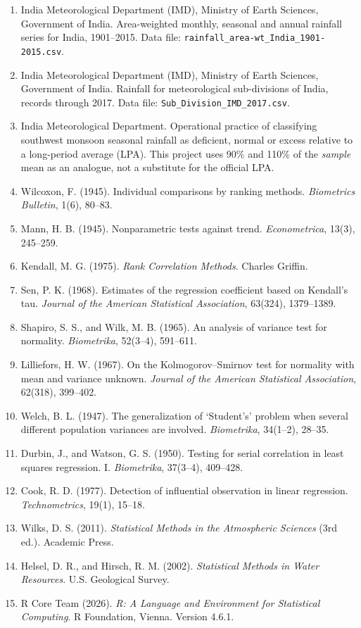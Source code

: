 \documentclass[
]{article}
\providecommand{\tightlist}{%
  \setlength{\itemsep}{0pt}\setlength{\parskip}{0pt}}
\begin{document}
\begin{enumerate}
\def\labelenumi{\arabic{enumi}.}
\tightlist
\item
  India Meteorological Department (IMD), Ministry of Earth Sciences,
  Government of India. Area-weighted monthly, seasonal and annual
  rainfall series for India, 1901--2015. Data file:
  \texttt{rainfall\_area-wt\_India\_1901-2015.csv}.
\item
  India Meteorological Department (IMD), Ministry of Earth Sciences,
  Government of India. Rainfall for meteorological sub-divisions of
  India, records through 2017. Data file:
  \texttt{Sub\_Division\_IMD\_2017.csv}.
\item
  India Meteorological Department. Operational practice of classifying
  southwest monsoon seasonal rainfall as deficient, normal or excess
  relative to a long-period average (LPA). This project uses 90\% and
  110\% of the \emph{sample} mean as an analogue, not a substitute for
  the official LPA.
\item
  Wilcoxon, F. (1945). Individual comparisons by ranking methods.
  \emph{Biometrics Bulletin}, 1(6), 80--83.
\item
  Mann, H. B. (1945). Nonparametric tests against trend.
  \emph{Econometrica}, 13(3), 245--259.
\item
  Kendall, M. G. (1975). \emph{Rank Correlation Methods}. Charles
  Griffin.
\item
  Sen, P. K. (1968). Estimates of the regression coefficient based on
  Kendall's tau. \emph{Journal of the American Statistical Association},
  63(324), 1379--1389.
\item
  Shapiro, S. S., and Wilk, M. B. (1965). An analysis of variance test
  for normality. \emph{Biometrika}, 52(3--4), 591--611.
\item
  Lilliefors, H. W. (1967). On the Kolmogorov--Smirnov test for
  normality with mean and variance unknown. \emph{Journal of the
  American Statistical Association}, 62(318), 399--402.
\item
  Welch, B. L. (1947). The generalization of `Student's' problem when
  several different population variances are involved.
  \emph{Biometrika}, 34(1--2), 28--35.
\item
  Durbin, J., and Watson, G. S. (1950). Testing for serial correlation
  in least squares regression. I. \emph{Biometrika}, 37(3--4), 409--428.
\item
  Cook, R. D. (1977). Detection of influential observation in linear
  regression. \emph{Technometrics}, 19(1), 15--18.
\item
  Wilks, D. S. (2011). \emph{Statistical Methods in the Atmospheric
  Sciences} (3rd ed.). Academic Press.
\item
  Helsel, D. R., and Hirsch, R. M. (2002). \emph{Statistical Methods in
  Water Resources}. U.S. Geological Survey.
\item
  R Core Team (2026). \emph{R: A Language and Environment for
  Statistical Computing}. R Foundation, Vienna. Version 4.6.1.
\end{enumerate}
\end{document}

